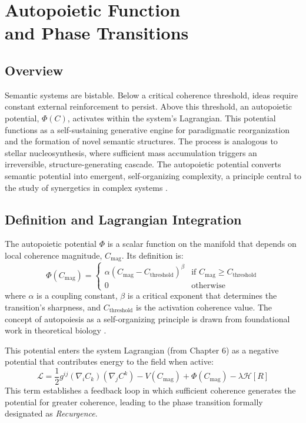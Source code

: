\chapter{Autopoietic Function \\ and Phase Transitions}

\section{Overview}

Semantic systems are bistable. Below a critical coherence threshold, ideas require constant external reinforcement to persist. Above this threshold, an autopoietic potential, \(\Phi(C)\), activates within the system's Lagrangian. This potential functions as a self-sustaining generative engine for paradigmatic reorganization and the formation of novel semantic structures. The process is analogous to stellar nucleosynthesis, where sufficient mass accumulation triggers an irreversible, structure-generating cascade. The autopoietic potential converts semantic potential into emergent, self-organizing complexity, a principle central to the study of synergetics in complex systems \autocite{Haken1983}.

\section{Definition and Lagrangian Integration}

The autopoietic potential \(\Phi\) is a scalar function on the manifold that depends on local coherence magnitude, \(C_{\mathrm{mag}}\). Its definition is:
\begin{equation}
\Phi(C_{\mathrm{mag}}) =
\begin{cases}
\alpha (C_{\mathrm{mag}} - C_{\text{threshold}})^{\beta} & \text{if } C_{\mathrm{mag}} \geq C_{\text{threshold}} \\
0 & \text{otherwise}
\end{cases}
\end{equation}
where \(\alpha\) is a coupling constant, \(\beta\) is a critical exponent that determines the transition's sharpness, and \(C_{\text{threshold}}\) is the activation coherence value. The concept of autopoiesis as a self-organizing principle is drawn from foundational work in theoretical biology \autocite{MaturanaVarela1980}.

This potential enters the system Lagrangian (from Chapter 6) as a negative potential that contributes energy to the field when active:
\begin{equation}
\mathcal{L} = \frac{1}{2} g^{ij} (\nabla_i C_k)(\nabla_j C^k) - V(C_{\mathrm{mag}}) + \Phi(C_{\mathrm{mag}}) - \lambda \mathcal{H}[R]
\end{equation}
This term establishes a feedback loop in which sufficient coherence generates the potential for greater coherence, leading to the phase transition formally designated as \textit{Recurgence}.

